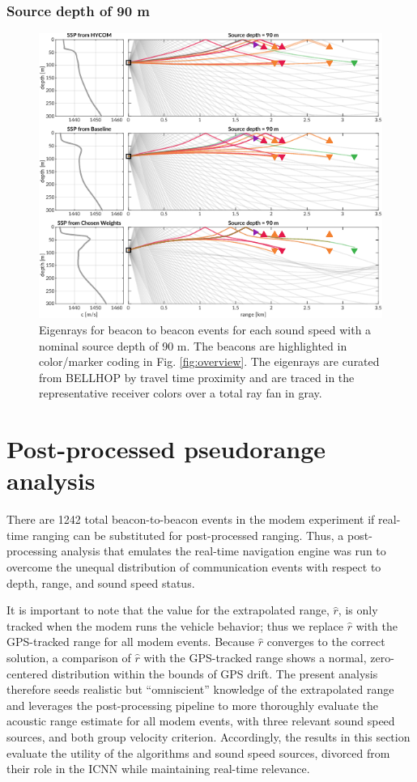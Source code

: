 \subsubsection{Source depth of 90 m}
\begin{figure}[ht!]
  \centering
  \includegraphics[width=\reprintcolumnwidth]{figs/raytrace-3env-zs-90.pdf}
  \caption{Eigenrays for beacon to beacon events for each sound speed with a nominal source depth of 90 m. The beacons are highlighted in color/marker coding in Fig. \ref{fig:overview}. The eigenrays are curated from BELLHOP by travel time proximity and are traced in the representative receiver colors over a total ray fan in gray.}
  \label{fig:raytrace-zs90}
\end{figure}

\clearpage
\section{\label{sec:post} Post-processed pseudorange analysis}

There are 1242 total beacon-to-beacon events in the modem experiment if real-time ranging can be substituted for post-processed ranging.
Thus, a post-processing analysis that emulates the real-time navigation engine was run to overcome the unequal distribution of communication events with respect to depth, range, and sound speed status.

It is important to note that the value for the extrapolated range, $\hat{r}$, is only tracked when the modem runs the vehicle behavior; thus we replace $\hat{r}$ with the GPS-tracked range for all modem events.
Because $\hat{r}$ converges to the correct solution, a comparison of $\hat{r}$ with the GPS-tracked range shows a normal, zero-centered distribution within the bounds of GPS drift.
The present analysis therefore seeds realistic but ``omniscient'' knowledge of the extrapolated range and leverages the post-processing pipeline to more thoroughly evaluate the acoustic range estimate for all modem events, with three relevant sound speed sources, and both group velocity criterion.
Accordingly, the results in this section evaluate the utility of the algorithms and sound speed sources, divorced from their role in the ICNN while maintaining real-time relevance.


